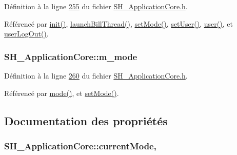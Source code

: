 Définition à la ligne \hyperlink{SH__ApplicationCore_8h_source_l00255}{255} du fichier \hyperlink{SH__ApplicationCore_8h_source}{S\-H\-\_\-\-Application\-Core.\-h}.



Référencé par \hyperlink{classSH__ApplicationCore_acc4f20b555300706bc08424c71c6bf02}{init()}, \hyperlink{classSH__ApplicationCore_ab72fd6cdc47575d47157fc7bdffae8f2}{launch\-Bill\-Thread()}, \hyperlink{classSH__ApplicationCore_a2bfe19528b27831332559d5d2cd24d25}{set\-Mode()}, \hyperlink{classSH__ApplicationCore_a2dd5c029a2ea348f1dfd0a60dea476e4}{set\-User()}, \hyperlink{classSH__ApplicationCore_a57fa0d6b5fd5f4a02f8a129ee470697b}{user()}, et \hyperlink{classSH__ApplicationCore_a3603a68faa57edb8722f9d1b67767368}{user\-Log\-Out()}.

\hypertarget{classSH__ApplicationCore_ab2bb2bdb19e4969dee699e0d4ae33e25}{
\subsubsection[{m\-\_\-mode}]{\setlength{\rightskip}{0pt plus 5cm}S\-H\-\_\-\-Application\-Core\-::m\-\_\-mode\hspace{0.3cm}{\ttfamily [private]}}}\label{classSH__ApplicationCore_ab2bb2bdb19e4969dee699e0d4ae33e25}


Définition à la ligne \hyperlink{SH__ApplicationCore_8h_source_l00260}{260} du fichier \hyperlink{SH__ApplicationCore_8h_source}{S\-H\-\_\-\-Application\-Core.\-h}.



Référencé par \hyperlink{classSH__ApplicationCore_a5d9ecb0e578e78d84591e36dccdf3d07}{mode()}, et \hyperlink{classSH__ApplicationCore_a2bfe19528b27831332559d5d2cd24d25}{set\-Mode()}.



\subsection{Documentation des propriétés}
\hypertarget{classSH__ApplicationCore_ac83ee9ad9c649105eb8eac5fac74b951}{
\subsubsection[{current\-Mode}]{\setlength{\rightskip}{0pt plus 5cm}S\-H\-\_\-\-Application\-Core\-::current\-Mode\hspace{0.3cm}{\ttfamily [read]}, {\ttfamily [write]}}}\label{classSH__ApplicationCore_ac83ee9ad9c649105eb8eac5fac74b951}



